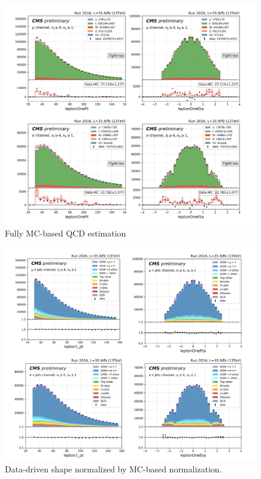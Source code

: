 \begin{figure}
    \centering
    \includegraphics[width=0.99\textwidth]{chapters/Analysis/sectionBackground/figures/ljets_application/mcNorm_mcShape.png}
    \caption{Fully MC-based QCD estimation}
    \label{fig:app:QCD:application_mc}
\end{figure}

\begin{figure}
    \centering
    \includegraphics[width=0.99\textwidth]{chapters/Analysis/sectionBackground/figures/ljets_application/mcNorm_ddShape.png}
    \caption{Data-driven shape normalized by MC-based normalization.}
    \label{fig:app:QCD:application_mcNorm_ddShape}
\end{figure}
\FloatBarrier


